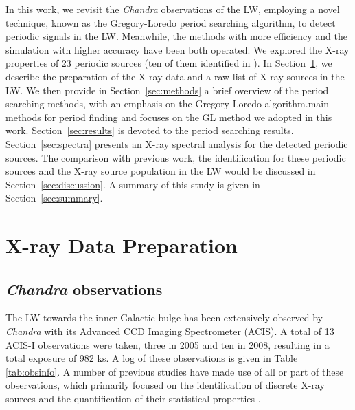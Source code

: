 \documentclass[fleqn,usenatbib]{mnras}
\begin{document}
In this work, we revisit the {\it Chandra} observations of the LW, employing a novel technique, known as the Gregory-Loredo period searching algorithm, to detect periodic signals in the LW. Meanwhile, the methods with more efficiency and the simulation with higher accuracy have been both operated. 
We explored the X-ray properties of 23 periodic sources (ten of them identified in \cite{2012ApJ...746..165H}). 
In Section~\ref{sec:obs}, we describe the preparation of the X-ray data and a raw list of X-ray sources in the LW.
We then provide in Section~\ref{sec:methods} a brief overview of the period searching methods, with an emphasis on the Gregory-Loredo algorithm.main methods for period finding and focuses on the GL method we adopted in this work. 
Section~\ref{sec:results} is devoted to the period searching results.
Section~\ref{sec:spectra} presents an X-ray spectral analysis for the detected periodic sources. 
The comparison with previous work, the identification for these periodic sources and the X-ray source population in the LW would be discussed in Section~\ref{sec:discussion}.
A summary of this study is given in Section~\ref{sec:summary}.

\section{X-ray Data Preparation} \label{sec:obs}
\subsection{{\it Chandra} observations} \label{subsec:xdata}
The LW towards the inner Galactic bulge has been extensively observed by {\it Chandra} with its Advanced CCD Imaging Spectrometer (ACIS).
A total of 13 ACIS-I observations were taken, three in 2005 and ten in 2008, resulting in a total exposure of 982 ks.
A log of these observations is given in Table \ref{tab:obsinfo}. 
A number of previous studies have made use of all or part of these observations, which primarily focused on the identification of discrete X-ray sources and the quantification of their statistical properties \citep{2009Natur.458.1142R,2009ApJ...700.1702V,2009ApJ...706..223H,2011MNRAS.414..495R,2012MNRAS.427.1633H,2013ApJ...766...14M,2016MNRAS.462L.106W}.
\end{document}
